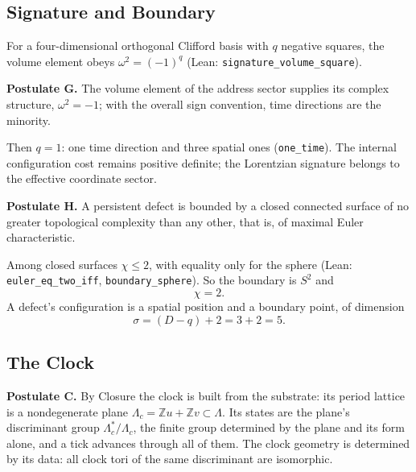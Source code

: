 \subsection{Signature and Boundary}
\label{sec:metric_signature}
For a four-dimensional orthogonal Clifford basis with $q$ negative squares, the volume element obeys $\omega^2=(-1)^q$ (Lean: \texttt{signature\_volume\_square}).

\textbf{Postulate G.} The volume element of the address sector supplies its complex structure, $\omega^2=-1$; with the overall sign convention, time directions are the minority.

Then $q=1$: one time direction and three spatial ones (\texttt{one\_time}). The internal configuration cost remains positive definite; the Lorentzian signature belongs to the effective coordinate sector.

\label{sec:topological_boundary}
\textbf{Postulate H.} A persistent defect is bounded by a closed connected surface of no greater topological complexity than any other, that is, of maximal Euler characteristic.

Among closed surfaces $\chi\le2$, with equality only for the sphere (Lean: \texttt{euler\_eq\_two\_iff}, \texttt{boundary\_sphere}). So the boundary is $S^2$ and
\begin{equation}
\chi=2.
\end{equation}
A defect's configuration is a spatial position and a boundary point, of dimension
\begin{equation}
\sigma=(D-q)+2=3+2=5.
\end{equation}

\subsection{The Clock}
\label{sec:fundamental_resonance}
\label{sec:fundamental_resonance_filter1}
\textbf{Postulate C.} By Closure the clock is built from the substrate: its period lattice is a nondegenerate plane $\Lambda_c=\mathbb Zu+\mathbb Zv\subset\Lambda$. Its states are the plane's discriminant group $\Lambda_c^*/\Lambda_c$, the finite group determined by the plane and its form alone, and a tick advances through all of them. The clock geometry is determined by its data: all clock tori of the same discriminant are isomorphic.

